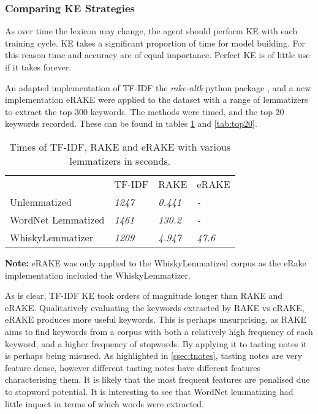 \subsubsection{Comparing KE Strategies}\label{sssec:kwecomp}
As over time the lexicon may change, the agent should perform KE with each training 
cycle. KE takes a significant proportion of time for model building. For this reason time and accuracy are of equal
importance.  Perfect KE is of little use if it takes forever.

An adapted implementation of TF-IDF \cite{tf_idf_imp} the \emph{rake-nltk} python package \cite{sharmer_2018}, and a
new implementation eRAKE were applied to the dataset with a range of lemmatizers to extract the top 300 keywords.
The methods were timed, and the top 20 keywords recorded. 
These can be found in tables \ref{tab:times} and \ref{tab:top20}.

\begin{table}
    \centering
    \begin{threeparttable}

        \caption{Times of TF-IDF, RAKE and eRAKE with various lemmatizers in seconds.}\label{tab:times}
        \begin{tabular}{llll} 
        \toprule
                           & TF-IDF        & RAKE           & eRAKE           \\
        Unlemmatized       & \textit{1247} & \textit{0.441} & \textit{-}      \\
        WordNet Lemmatized & \textit{1461} & \textit{130.2} & \textit{-}      \\
        WhiskyLemmatizer   & \textit{1209} & \textit{4.947} & \textit{47.6}  \\
        \bottomrule
        \end{tabular}
        \begin{tablenotes}
            \small
            \item \textbf{Note:} eRAKE was only applied to the WhiskyLemmatized corpus
            as the eRake implementation included the WhiskyLemmatizer.
        \end{tablenotes}
    \end{threeparttable}
\end{table}

As is clear, TF-IDF KE took orders of magnitude longer than RAKE and eRAKE.  
Qualitatively evaluating the keywords extracted by RAKE vs eRAKE, eRAKE produces more useful keywords.
This is perhaps unsurprising, as RAKE aims to find keywords from a corpus with both a relatively high frequency
of each keyword, and a higher frequency of stopwords.  By applying it to tasting notes it is perhaps 
being misused. As highlighted in \autoref{ssec:tnotes}, tasting notes are very feature dense, however different
tasting notes have different features characterising them.  It is likely that the most frequent features are
penalised due to stopword potential. It is interesting to see that WordNet lemmatizing had little impact 
in terms of which words were extracted.

